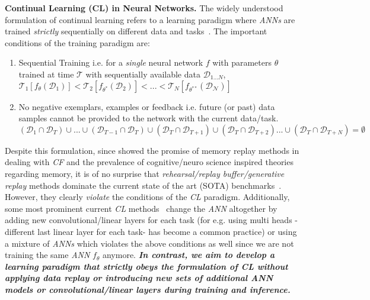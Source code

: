 \documentclass{article}
\begin{document}
\textbf{Continual Learning (CL) in Neural Networks.} \label{cl}The widely understood formulation of continual learning
refers to a learning paradigm where \textit{ANNs} are trained \textit{strictly} sequentially on different data and tasks~\cite{chen2018lifelong, mundt2020wholistic}. The important conditions of the training paradigm are:
\begin{enumerate}[topsep=0pt,itemsep=-1ex,partopsep=1ex,parsep=1ex]
    \item Sequential Training i.e. for a \textit{single} neural network $f$ with parameters $\theta$ trained at time $\mathcal{T}$ with sequentially available data $\mathcal{D}_{1...N}$,\\
        $\mathcal{T}_1[f_{\theta}(\mathcal{D}_1)] < \mathcal{T}_2[f_{\theta^*}(\mathcal{D}_2)] < ... < \mathcal{T}_N[f_{\theta^{**}}(\mathcal{D}_\mathcal{N})]$
    \item No negative exemplars, examples or feedback i.e. future (or past) data samples cannot be provided to the network with the current data/task.\\
    $(\mathcal{D}_1\cap\mathcal{D}_T)\cup...\cup(\mathcal{D}_{T-1}\cap\mathcal{D}_T)\cup(\mathcal{D}_T\cap\mathcal{D}_{T+1})\cup(\mathcal{D}_T\cap\mathcal{D}_{T+2})...\cup(\mathcal{D}_T\cap\mathcal{D}_{T+N}) = \emptyset$
\end{enumerate}
Despite this formulation, since \cite{robins_catastrophic_1993} showed the promise of memory replay methods in dealing with \textit{CF} and the prevalence of cognitive/neuro science inspired theories regarding memory, it is of no surprise that \textit{rehearsal/replay buffer/generative replay} methods dominate the current state of the art (SOTA) benchmarks~\cite{titsias2019functional, fear17, pan2021continual, lee_continual_2020}. However, they clearly \textit{violate} the conditions of the \textit{CL} paradigm. Additionally, some most prominent current \textit{CL} methods~\cite{Serr2018OvercomingCF, lee_continual_2020, guo2020improved, yoo_snow_2020} change the \textit{ANN} altogether by adding new convolutional/linear layers for each task (for e.g. using multi heads -different last linear layer for each task- has become a common practice) or using a mixture of \textit{ANNs} which violates the above conditions as well since we are not training the same \textit{ANN} $f_{\theta}$ anymore. \textbf{\textit{In contrast, we aim to develop a learning paradigm that strictly obeys the formulation of CL without applying data replay or introducing new sets of additional ANN models or convolutional/linear layers during training and inference.}}
\end{document}
